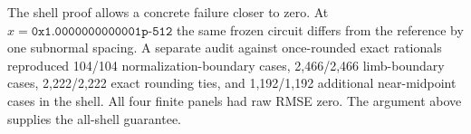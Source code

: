 The shell proof allows a concrete failure closer to zero. At $x=\texttt{0x1.0000000000001p-512}$ the same frozen circuit differs from the reference by one subnormal spacing. A separate audit against once-rounded exact rationals reproduced 104/104 normalization-boundary cases, 2,466/2,466 limb-boundary cases, 2,222/2,222 exact rounding ties, and 1,192/1,192 additional near-midpoint cases in the shell. All four finite panels had raw RMSE zero. The argument above supplies the all-shell guarantee.
